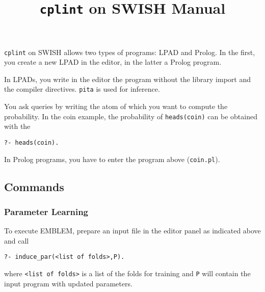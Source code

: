\documentclass[a4paper,10pt]{scrartcl}
\begin{document}
\title{\texttt{cplint} on SWISH Manual}
\maketitle

%





\verb|cplint| on SWISH allows two types of programs: LPAD and Prolog. In the first, you create a new LPAD in the editor, in the latter a Prolog program. 

In LPADs, you write in the editor the program without the library import and the compiler directives. \verb|pita| is used for inference.

You ask queries by writing the atom of which you want to compute the probability. In the coin example, the probability of \verb|heads(coin)| can be obtained with the 
\begin{verbatim}
?- heads(coin).
\end{verbatim}

In Prolog programs, you have to enter the program above (\verb|coin.pl|).









\subsection{Commands}
\subsubsection{Parameter Learning}
To execute EMBLEM, prepare an input file in the editor panel as indicated above 
and call
\begin{verbatim}
?- induce_par(<list of folds>,P).
\end{verbatim}
where \verb|<list of folds>| is a list of the folds for training and
\verb|P| will contain the input program with updated parameters.
\end{document}

